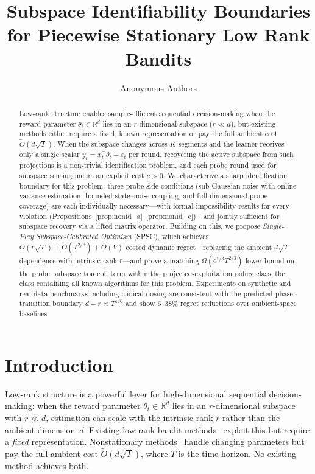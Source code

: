 \documentclass{article}
\title{Subspace Identifiability Boundaries for Piecewise Stationary Low Rank Bandits}
\author{
  Anonymous Authors
}
\newcommand{\R}{\mathbb{R}}
\begin{document}
\maketitle


\begin{abstract}
  Low-rank structure enables sample-efficient sequential decision-making when the reward parameter
  $\theta_t \in \R^d$ lies in an $r$-dimensional subspace ($r \ll d$), but existing methods either
  require a fixed, known representation or pay the full ambient cost $\widetilde{O}(d\sqrt{T})$.
  When the subspace changes across $K$ segments and the learner receives only a single scalar
  $y_t = x_t^\top\theta_t + \varepsilon_t$ per round, recovering the active subspace from such
  projections is a non-trivial identification problem, and each probe round used for subspace
  sensing incurs an explicit cost $c > 0$.
  We characterize a sharp identification boundary for this problem: three probe-side conditions
  (sub-Gaussian noise with online variance estimation, bounded state--noise coupling, and
  full-dimensional probe coverage) are each individually necessary---with formal impossibility
  results for every violation (Propositions~\ref{prop:nonid_a}--\ref{prop:nonid_c})---and jointly
  sufficient for subspace recovery via a lifted matrix operator.
  Building on this, we propose \emph{Single-Play Subspace-Calibrated Optimism} (SPSC), which
  achieves $\widetilde{O}(r\sqrt{T}) + \widetilde{O}(T^{2/3}) + O(V)$ costed dynamic regret---replacing
  the ambient $d\sqrt{T}$ dependence with intrinsic rank $r$---and prove a matching
  $\Omega(c^{1/3}T^{2/3})$ lower bound on the probe--subspace tradeoff term within the
  projected-exploitation policy class, the class containing all known algorithms for this problem.
  Experiments on synthetic and real-data benchmarks including clinical dosing are consistent with
  the predicted phase-transition boundary $d - r \asymp T^{1/6}$ and show 6--38\% regret
  reductions over ambient-space baselines.
  \end{abstract}
\section{Introduction}
\label{sec:intro}
  Low-rank structure is a powerful lever for high-dimensional
  sequential decision-making: when the reward parameter
  $\theta_t \in \R^d$ lies in an $r$-dimensional subspace with
  $r \ll d$, estimation can scale with the intrinsic
  rank $r$ rather than the ambient dimension~$d$. Existing low-rank
  bandit methods~\citep{jun2019bilinear,pmlr-v235-jedra24a,lu2021lowrank}
  exploit this but require a \emph{fixed} representation.
  Nonstationary methods~\citep{russac2019weighted,cheung2019learning}
  handle changing parameters but pay the full ambient cost
  $\widetilde{O}(d\sqrt{T})$, where $T$ is the time horizon.
  No existing method achieves both.
\end{document}
